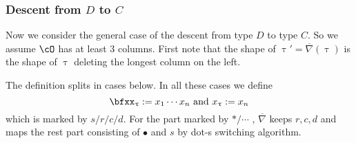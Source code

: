 \documentclass[12pt,a4paper]{amsart}
\def\eDD{\overline{\nabla}}
\numberwithin{equation}{section}
\theoremstyle{remark}
\begin{document}
\subsubsection{Descent from $D$ to $C$} Now we consider the general case of the
descent from type $D$ to type $C$. So we assume $\cO$ has at least 3 columns.
First note that the shape of $\uptau' = \eDD(\uptau)$ is the shape of $\uptau$ deleting the
longest column on the left.

The definition splits in cases below. In all these cases we define
\begin{equation}\label{eq:x.uptau}
\bfxx_{\uptau} := x_{1}\cdots x_{n} \text{ and } x_{\uptau} := x_{n}
\end{equation}
which is marked by $s/r/c/d$.
For the part marked by $*/\cdots$ , $\eDD$ keeps $r,c,d$ and maps the rest part consisting of $\bullet$ and $s$ by dot-s switching algorithm.
\end{document}
